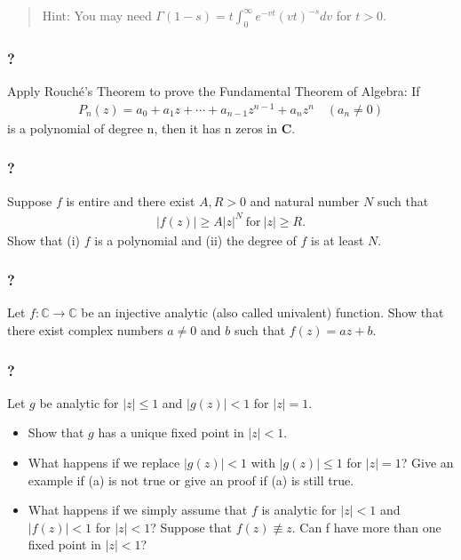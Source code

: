 \begin{quote}
Hint: You may need
\(\displaystyle{\Gamma(1-s)=t \int_0^{\infty}e^{-vt}(vt)^{-s} dv}\) for
\(t>0\).
\end{quote}

\hypertarget{section-129}{%
\subsubsection{?}\label{section-129}}

Apply Rouché's Theorem to prove the Fundamental Theorem of Algebra: If
\begin{align*}P_n(z) = a_0 + a_1z + \cdots + a_{n-1}z^{n-1} + a_nz^n\quad  (a_n \neq 0)\end{align*}
is a polynomial of degree n, then it has n zeros in \(\mathbf C\).

\hypertarget{section-130}{%
\subsubsection{?}\label{section-130}}

Suppose \(f\) is entire and there exist \(A, R >0\) and natural number
\(N\) such that
\begin{align*}|f(z)| \geq A |z|^N\ \text{for}\ |z| \geq R.\end{align*}
Show that (i) \(f\) is a polynomial and (ii) the degree of \(f\) is at
least \(N\).

\hypertarget{section-131}{%
\subsubsection{?}\label{section-131}}

Let \(f: {\mathbb C} \rightarrow {\mathbb C}\) be an injective analytic
(also called univalent) function. Show that there exist complex numbers
\(a \neq 0\) and \(b\) such that \(f(z) = az + b\).

\hypertarget{section-132}{%
\subsubsection{?}\label{section-132}}

Let \(g\) be analytic for \(|z|\leq 1\) and \(|g(z)| < 1\) for
\(|z| = 1\).

\begin{itemize}
\item
  Show that \(g\) has a unique fixed point in \(|z| < 1\).
\item
  What happens if we replace \(|g(z)| < 1\) with \(|g(z)|\leq 1\) for
  \(|z|=1\)? Give an example if (a) is not true or give an proof if (a)
  is still true.
\item
  What happens if we simply assume that \(f\) is analytic for
  \(|z| < 1\) and \(|f(z)| < 1\) for \(|z| < 1\)? Suppose that
  \(f(z) \not\equiv z\). Can f have more than one fixed point in
  \(|z| < 1\)?
\end{itemize}

